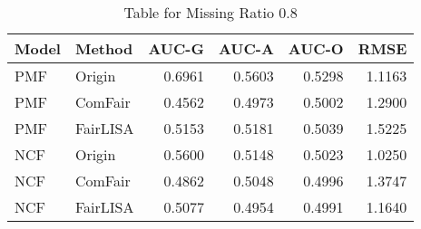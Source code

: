 \begin{table}
\centering
\caption{Table for Missing Ratio 0.8}
\label{tab:missing_0.8}
\begin{tabular}{llrrrr}
\toprule
Model &   Method &  AUC-G &  AUC-A &  AUC-O &   RMSE \\
\midrule
  PMF &   Origin & 0.6961 & 0.5603 & 0.5298 & 1.1163 \\
  PMF &  ComFair & 0.4562 & 0.4973 & 0.5002 & 1.2900 \\
  PMF & FairLISA & 0.5153 & 0.5181 & 0.5039 & 1.5225 \\
  NCF &   Origin & 0.5600 & 0.5148 & 0.5023 & 1.0250 \\
  NCF &  ComFair & 0.4862 & 0.5048 & 0.4996 & 1.3747 \\
  NCF & FairLISA & 0.5077 & 0.4954 & 0.4991 & 1.1640 \\
\bottomrule
\end{tabular}
\end{table}
